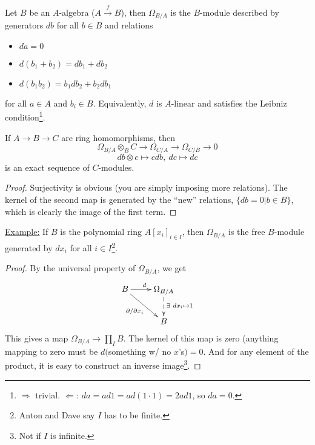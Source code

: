  \setcounter{lecture}{17}

 \begin{definition} Let $B$ be an
 $A$-algebra ($A\xrightarrow{f} B$), then $\Omega_{B/A}$ is the
 $B$-module described by generators $db$ for all $b\in B$ and
 relations
 \begin{itemize}
  \item[] $da = 0$
  \item[] $d(b_1+b_2)=db_1+db_2$
  \item[] $d(b_1b_2)=b_1db_2+b_2db_1$
 \end{itemize}
 for all $a\in A$ and $b_i\in B$.  Equivalently, $d$ is $A$-linear
 and satisfies the Leibniz condition\footnote{$\Rightarrow$ trivial. $\Leftarrow:\
 da = ad1 = ad(1\cdot 1) = 2ad1$, so $da=0$.}.
 \end{definition}

 \begin{proposition}\label{P:II.8.3A} If $A\to B \to C$
 are ring homomorphisms, then
 \[
 \Omega_{B/A}\otimes_B C   \longrightarrow \Omega_{C/A}   \longrightarrow \Omega_{C/B} \to
 0\]
 \[ db\otimes c  \mapsto cdb,\ dc  \mapsto dc \]
 is an exact sequence of $C$-modules.
 \end{proposition}
 \begin{proof}
 Surjectivity is obvious (you are simply imposing more relations).
 The kernel of the second map is generated by the ``new''
 relations, $\{ db=0| b\in B\}$, which is clearly the image of the
 first term.
 \end{proof}

 \underline{Example:} If $B$ is the polynomial ring $A[x_i]_{i\in
 I}$, then $\Omega_{B/A}$ is the free $B$-module generated by
 $dx_i$ for all $i\in I$\footnote{Anton and Dave say $I$ has to be finite.}.
 \begin{proof}
 By the universal property of $\Omega_{B/A}$, we get
 \[\xymatrix{
  B \ar[r]^d \ar[dr]_{\partial/\partial x_i} & \Omega_{B/A}\ar@{-->}[d]^{\exists\ dx_i\mapsto 1}\\
  & B
 }\]
 This gives a map $\Omega_{B/A}\to \prod_I B$.  The kernel of this
 map is zero (anything mapping to zero must be $d($something w/ no
 $x$'s$) = 0$.  And for any element of the product, it is easy to
 construct an inverse image\footnote{Not if $I$ is infinite.}.
 \end{proof}

